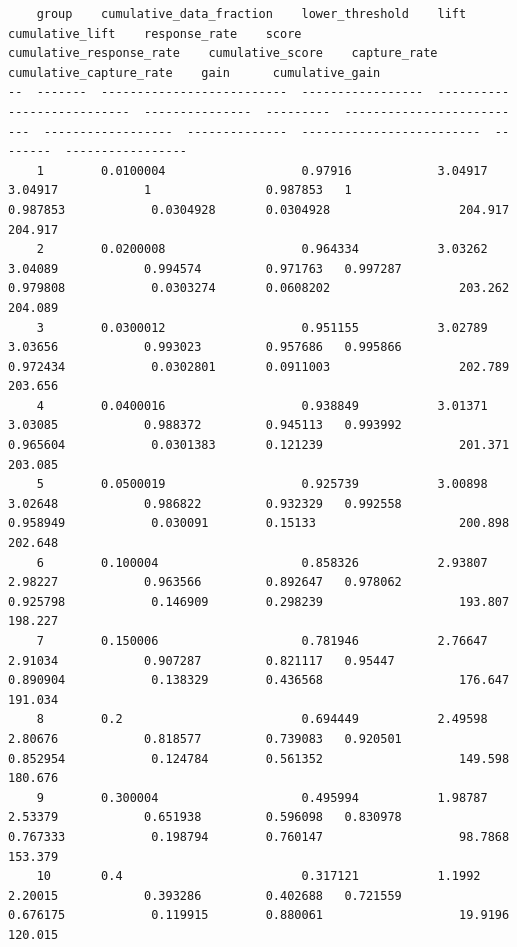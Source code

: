 \documentclass[11pt]{article}
\begin{document}
    
    \begin{verbatim}
    group    cumulative_data_fraction    lower_threshold    lift        cumulative_lift    response_rate    score      cumulative_response_rate    cumulative_score    capture_rate    cumulative_capture_rate    gain      cumulative_gain
--  -------  --------------------------  -----------------  ----------  -----------------  ---------------  ---------  --------------------------  ------------------  --------------  -------------------------  --------  -----------------
    1        0.0100004                   0.97916            3.04917     3.04917            1                0.987853   1                           0.987853            0.0304928       0.0304928                  204.917   204.917
    2        0.0200008                   0.964334           3.03262     3.04089            0.994574         0.971763   0.997287                    0.979808            0.0303274       0.0608202                  203.262   204.089
    3        0.0300012                   0.951155           3.02789     3.03656            0.993023         0.957686   0.995866                    0.972434            0.0302801       0.0911003                  202.789   203.656
    4        0.0400016                   0.938849           3.01371     3.03085            0.988372         0.945113   0.993992                    0.965604            0.0301383       0.121239                   201.371   203.085
    5        0.0500019                   0.925739           3.00898     3.02648            0.986822         0.932329   0.992558                    0.958949            0.030091        0.15133                    200.898   202.648
    6        0.100004                    0.858326           2.93807     2.98227            0.963566         0.892647   0.978062                    0.925798            0.146909        0.298239                   193.807   198.227
    7        0.150006                    0.781946           2.76647     2.91034            0.907287         0.821117   0.95447                     0.890904            0.138329        0.436568                   176.647   191.034
    8        0.2                         0.694449           2.49598     2.80676            0.818577         0.739083   0.920501                    0.852954            0.124784        0.561352                   149.598   180.676
    9        0.300004                    0.495994           1.98787     2.53379            0.651938         0.596098   0.830978                    0.767333            0.198794        0.760147                   98.7868   153.379
    10       0.4                         0.317121           1.1992      2.20015            0.393286         0.402688   0.721559                    0.676175            0.119915        0.880061                   19.9196   120.015

\end{verbatim}
\end{document}
